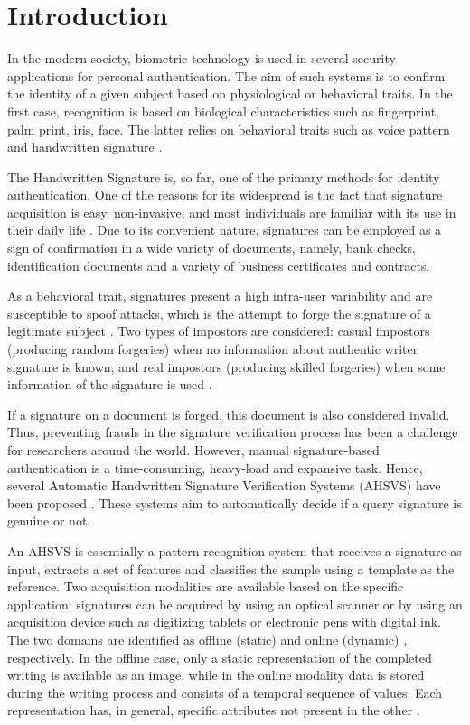 
\chapter{Introduction}

In the modern society, biometric technology is used in several security applications for personal authentication. The aim of such systems is to confirm the identity of a given subject based on physiological or behavioral traits. In the first case, recognition is based on biological characteristics such as fingerprint, palm print, iris, face. The latter relies on behavioral traits such as voice pattern and handwritten signature \cite{jain2004biometrics}.

The Handwritten Signature is, so far, one of the primary methods for identity authentication. One of the reasons for its widespread is the fact that signature acquisition is easy, non-invasive, and most individuals are familiar with its use in their daily life \cite{impedovo2008state}. Due to its convenient nature, signatures can be employed as a sign of confirmation in a wide variety of documents, namely, bank checks, identification documents and a variety of business certificates and contracts.

As a behavioral trait, signatures present a high intra-user variability and are susceptible to spoof attacks, which is the attempt to forge the signature of a legitimate subject \cite{jain2004biometrics}. Two types of impostors are considered: casual impostors (producing random forgeries) when no information about authentic writer signature is known, and real impostors (producing skilled forgeries) when some information of the signature is used \cite{fierrez2008handbook}.


If a signature on a document is forged, this document is also considered invalid. Thus, preventing frauds in the signature verification process has been a challenge for researchers around the world. However, manual signature-based authentication is a time-consuming, heavy-load and expansive task. Hence, several Automatic Handwritten Signature Verification Systems (AHSVS) have been proposed \cite{impedovo2008state}. These systems aim to automatically decide if a query signature is genuine or not.

An AHSVS is essentially a pattern recognition system that receives a signature as input, extracts a set of features and classifies the sample using a template as the reference. Two acquisition modalities are available based on the specific application: signatures can be acquired by using an optical scanner or by using an acquisition device such as digitizing tablets or electronic pens with digital ink. The two domains are identified as offline (static) \cite{hafemann2015offline} and online (dynamic) \cite{cpalka2014line}, respectively. In the offline case, only a static representation of the completed writing is available as an image, while in the online modality data is stored during the writing process and consists of a temporal sequence of values. Each representation has, in general, specific attributes not present in the other \cite{viard1999ireste}.

